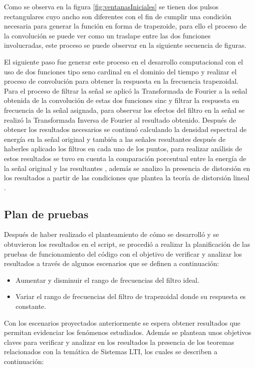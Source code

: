 Como se observa en la figura \ref{fig:ventanasIniciales} se tienen dos pulsos rectangulares cuyo ancho son diferentes con el fin de cumplir una condición necesaria para generar la función en forma de trapezoide, para ello el proceso de la convolución se puede ver como un traslape entre las dos funciones involucradas, este proceso se puede observar en la siguiente secuencia de figuras.

\vspace{-3mm}

\vspace{-9mm}

\vspace{-9mm}

\vspace{-5mm}

El siguiente paso fue generar este proceso en el desarrollo computacional con el uso de dos funciones tipo seno cardinal en el dominio del tiempo y realizar el proceso de convolución para obtener la respuesta en la frecuencia trapezoidal. Para el proceso de filtrar la señal se aplicó la Transformada de Fourier a la señal obtenida de la convolución de estas dos funciones sinc y filtrar la respuesta en frecuencia de la señal asignada, para observar los efectos del filtro en la señal se realizó la Transformada Inversa de Fourier al resultado obtenido. Después de obtener los resultados necesarios se continuó calculando la densidad espectral de energía en la señal original y también a las señales resultantes después de haberles aplicado los filtros en cada uno de los puntos, para realizar análisis de estos resultados se tuvo en cuenta la comparación porcentual entre la energía de la señal original y las resultantes \cite{densidad2021}, además se analizo la presencia de distorsión en los resultados a partir de las condiciones que plantea la teoría de distorsión lineal \cite{quiz2021}.

\subsection{Plan de pruebas}\label{planPruebas}
Después de haber realizado el planteamiento de cómo se desarrolló y se obtuvieron los resultados en el script, se procedió a realizar la planificación de las pruebas de funcionamiento del código con el objetivo de verificar y analizar los resultados a través de algunos escenarios que se definen a continuación:

\begin{itemize}
	\item Aumentar y disminuir el rango de frecuencias del filtro ideal.
	\item Variar el rango de frecuencias del filtro de trapezoidal donde su respuesta es constante.
\end{itemize}

Con los escenarios proyectados anteriormente se espera obtener resultados que permitan evidenciar los fenómenos estudiados. Además se plantean unos objetivos claves para verificar y analizar en los resultados la presencia de los teoremas relacionados con la temática de Sistemas LTI, los cuales se describen a continuación:

